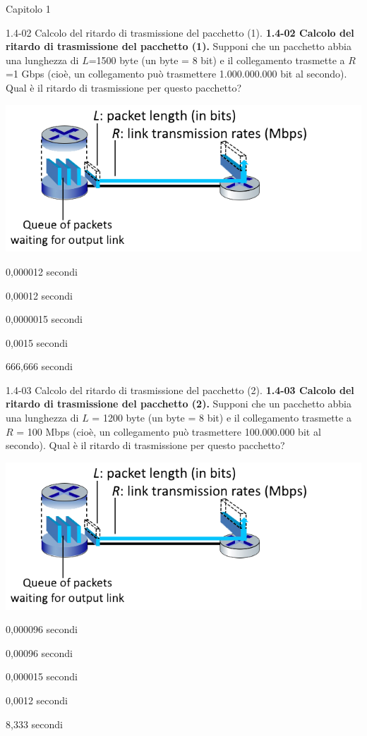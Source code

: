 \documentclass[a4paper]{article}
\begin{document}
\begin{quiz}{Capitolo 1}
\begin{multi}[points=1,shuffle=true]{1.4-02 Calcolo del ritardo di trasmissione del pacchetto (1).}
\textbf{1.4-02 Calcolo del ritardo di trasmissione del pacchetto (1).}
Supponi che un pacchetto abbia una lunghezza di $L$=1500 byte (un byte = 8 bit) e il collegamento trasmette a $R$=1 Gbps (cioè, un collegamento può trasmettere 1.000.000.000 bit al secondo).
Qual è il ritardo di trasmissione per questo pacchetto?
\begin{center}
\includegraphics[width=.8\linewidth]{figs/1.4.2.png}
\end{center}
\item* 0,000012 secondi
\item 0,00012 secondi
\item 0,0000015 secondi
\item 0,0015 secondi
\item 666,666 secondi
\end{multi}

\begin{multi}[points=1,shuffle=true]{1.4-03 Calcolo del ritardo di trasmissione del pacchetto (2).}
\textbf{1.4-03 Calcolo del ritardo di trasmissione del pacchetto (2).}
Supponi che un pacchetto abbia una lunghezza di $L$ = 1200 byte (un byte = 8 bit) e il collegamento trasmette a $R$ = 100 Mbps (cioè, un collegamento può trasmettere 100.000.000 bit al secondo).  Qual è il ritardo di trasmissione per questo pacchetto?
\begin{center}
\includegraphics[width=.8\linewidth]{figs/1.4.2.png}
\end{center}
\item* 0,000096 secondi
\item 0,00096 secondi
\item 0,000015 secondi
\item 0,0012 secondi
\item 8,333 secondi
\end{multi}


\end{quiz}
\end{document}

